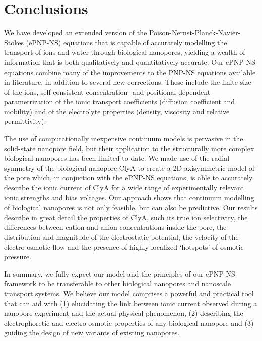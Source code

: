 \documentclass[journal=ancac3,manuscript=article,etalmode=truncate,maxauthors=0,layout=onecolumn]{achemso}
\begin{document}
\section{Conclusions}\label{sec:conclusions}

We have developed an extended version of the Poison-Nernst-Planck-Navier-Stokes (ePNP-NS) equations that is
capable of accurately modelling the transport of ions and water through biological nanopores, yielding a
wealth of information that is both qualitatively and quantitatively accurate. Our ePNP-NS equations combine
many of the improvements to the PNP-NS equations available in literature, in addition to several new
corrections. These include the finite size of the ions, self-consistent concentration- and
positional-dependent parametrization of the ionic transport coefficients (diffusion coefficient and mobility)
and of the electrolyte properties (density, viscosity and relative permittivity).

The use of computationally inexpensive continuum models is pervasive in the solid-state nanopore field, but
their application to the structurally more complex biological nanopores has been limited to date. We made use
of the radial symmetry of the biological nanopore ClyA to create a 2D-axisymmetric model of the pore which, in
conjuction with the ePNP-NS equations, is able to accurately describe the ionic current of ClyA for a wide
range of experimentally relevant ionic strengths and bias voltages. Our approach shows that continuum
modelling of biological nanopores is not only feasible, but can also be predictive. Our results describe in
great detail the properties of ClyA, such its true ion selectivity, the differences between cation and anion
concentrations inside the pore, the distribution and magnitude of the electrostatic potential, the velocity of
the electro-osmotic flow and the presence of highly localized `hotspots' of osmotic pressure. 

In summary, we fully expect our model and the principles of our ePNP-NS framework to be transferable to other
biological nanopores and nanoscale transport systems. We believe our model comprises a powerful and practical
tool that can aid with (1) elucidating the link between ionic current observed during a nanopore experiment
and the actual physical phenomenon, (2) describing the electrophoretic and electro-osmotic properties of any
biological nanopore and (3) guiding the design of new variants of existing nanopores. 

\end{document}
